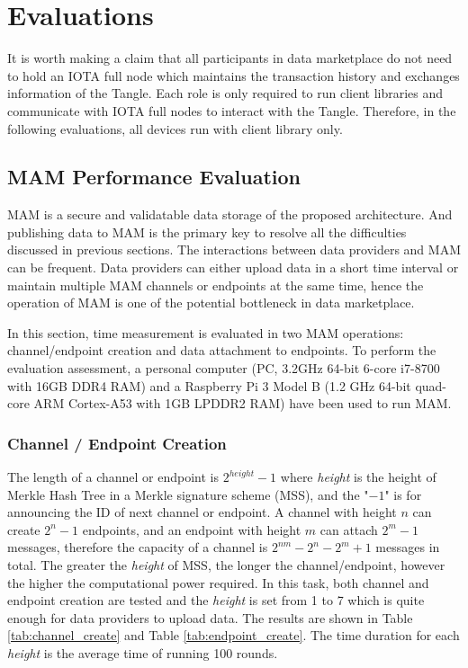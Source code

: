 \documentclass[conference]{IEEEtran}
\begin{document}
\section{Evaluations}
\label{section:evaluation}
It is worth making a claim that all participants in data marketplace do not need to hold an IOTA full node which maintains the transaction history and exchanges information of the Tangle. Each role is only required to run client libraries and communicate with IOTA full nodes to interact with the Tangle. Therefore, in the following evaluations, all devices run with client library only.

\subsection{MAM Performance Evaluation}
\label{section:mam_performance}
MAM is a secure and validatable data storage of the proposed architecture. And publishing data to MAM is the primary key to resolve all the difficulties discussed in previous sections. The interactions between data providers and MAM can be frequent. Data providers can either upload data in a short time interval or maintain multiple MAM channels or endpoints at the same time, hence the operation of MAM is one of the potential bottleneck in data marketplace.

In this section, time measurement is evaluated in two MAM operations: channel/endpoint creation and data attachment to endpoints. To perform the evaluation assessment, a personal computer (PC, 3.2GHz 64-bit 6-core i7-8700 with 16GB DDR4 RAM) and a Raspberry Pi 3 Model B (1.2 GHz 64-bit quad-core ARM Cortex-A53 with 1GB LPDDR2 RAM) have been used to run MAM. 

\subsubsection{Channel / Endpoint Creation}
The length of a channel or endpoint is $2^{height}-1$ where \textit{height} is the height of Merkle Hash Tree in a Merkle signature scheme (MSS), and the "$-1$" is for announcing the ID of next channel or endpoint. A channel with height $n$ can create $2^n-1$ endpoints, and an endpoint with height $m$ can attach $2^m-1$ messages, therefore the capacity of a channel is $2^{nm}-2^n-2^m+1$ messages in total. The greater the \textit{height} of MSS, the longer the channel/endpoint, however the higher the computational power required. In this task, both channel and endpoint creation are tested and the \textit{height} is set from 1 to 7 which is quite enough for data providers to upload data. The results are shown in Table \ref{tab:channel_create} and Table \ref{tab:endpoint_create}. The time duration for each \textit{height} is the average time of running 100 rounds.
\end{document}
